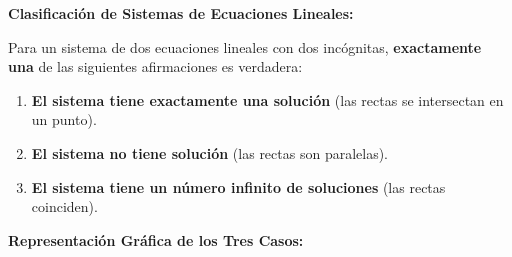 \begin{theorem}
\textbf{Clasificación de Sistemas de Ecuaciones Lineales:}

Para un sistema de dos ecuaciones lineales con dos incógnitas, \textbf{exactamente una} de las siguientes afirmaciones es verdadera:

\begin{enumerate}
    \item \textbf{El sistema tiene exactamente una solución} (las rectas se intersectan en un punto).
    \item \textbf{El sistema no tiene solución} (las rectas son paralelas).
    \item \textbf{El sistema tiene un número infinito de soluciones} (las rectas coinciden).
\end{enumerate}
\end{theorem}

\textbf{Representación Gráfica de los Tres Casos:}

